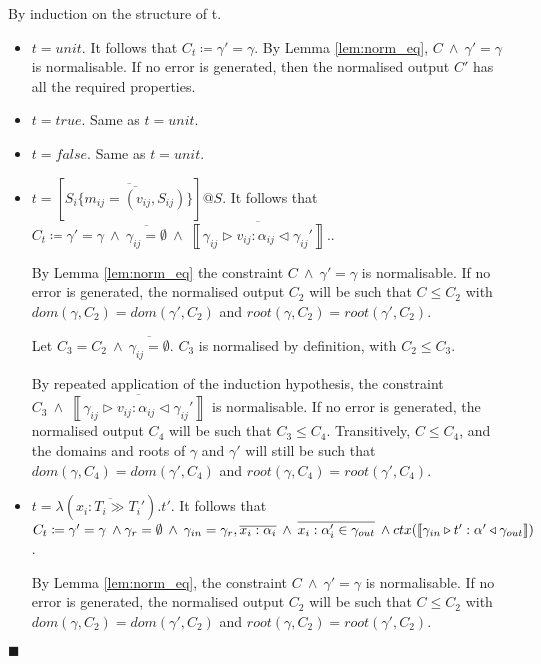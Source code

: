 \documentclass[preprint]{sigplanconf}
\newcommand{\lemref}[1]{Lemma \ref{#1}}
\newcommand{\inferrule}[4]{\left\llbracket #1 \triangleright #2 : #3 \triangleleft #4 \right\rrbracket}
\newcommand{\cand}{\:\wedge\:}
\newcommand{\qed}{$\blacksquare$}
\newenvironment{proof}{\vspace{1ex}\noindent{\bf Proof}\hspace{0.5em}}
  {\hfill\qed\vspace{1ex}}
\begin{document}
\begin{proof}
By induction on the structure of t.

\begin{itemize}
\item $t = unit$. It follows that 
$C_t \coloneqq \gamma' = \gamma$. 
By \lemref{lem:norm_eq}, $C \cand \gamma' = \gamma$ is normalisable.
If no error is generated, then the normalised output $C'$ has all the required 
properties.

\item $t = true$. Same as $t = unit$.

\item $t = false$. Same as $t = unit$. 

\item $t = \left[ \overline{ S_i \{ \overline{m_{ij} = (v_{ij}, S_{ij})} \} }  \right]@S$.
It follows that \\
$C_t \coloneqq 
\gamma' = \gamma \cand
\overline{\gamma_{ij} = \emptyset} \cand
\overline{\inferrule{\gamma_{ij}}{v_{ij}}{\alpha_{ij}}{\gamma_{ij}'}}.
$.

By \lemref{lem:norm_eq} the constraint $C \cand \gamma' = \gamma$ is
normalisable. If no error is generated, the normalised output $C_2$ will be such that $C \leq C_2$ with
$dom(\gamma, C_2) = dom(\gamma', C_2)$ and $root(\gamma, C_2) = root(\gamma', C_2)$.

Let $C_3 = C_2 \cand \overline{\gamma_{ij} = \emptyset}$. 
$C_3$ is normalised by definition, with $C_2 \leq C_3$.

By repeated application of the induction hypothesis, the constraint
$C_3 \cand \overline{\inferrule{\gamma_{ij}}{v_{ij}}{\alpha_{ij}}{\gamma_{ij}'}}$
is normalisable. If no error is generated, the normalised output $C_4$ will be such that $C_3 \leq C_4$. Transitively, $C \leq C_4$, and the domains and roots
of $\gamma$ and $\gamma'$ will still be such that $dom(\gamma, C_4) = dom(\gamma', C_4)$ and $root(\gamma, C_4) = root(\gamma', C_4)$.

\item $t = \lambda(\overline{x_i : T_i \gg T_i'}).t'$. 
It follows that 
$C_t \coloneqq 
\gamma' = \gamma \cand \\
\gamma_r = \emptyset \cand \gamma_{in} = \gamma_r, \overline{x_i : \alpha_i} \cand
\overline{x_i : \alpha_i' \in \gamma_{out}} \cand \\
ctx(\inferrule{\gamma_{in}}{t'}{\alpha'}{\gamma_{out}})$.

By \lemref{lem:norm_eq}, the constraint $C \cand \gamma' = \gamma$
is normalisable. If no error is generated, the normalised output $C_2$ will be such that $C \leq C_2$ with $dom(\gamma, C_2) = dom(\gamma', C_2)$ and
$root(\gamma, C_2) = root(\gamma', C_2)$.


\end{itemize}
\end{proof}
\end{document}
